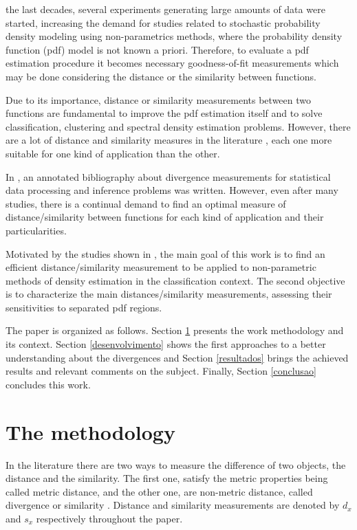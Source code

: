 \documentclass[conference]{IEEEtran}
\begin{document}
 the last decades, several experiments generating large amounts of data were started, increasing the demand for studies related to stochastic probability density modeling using non-parametrics methods, where the probability density function (pdf) model is not known a priori. Therefore, to evaluate a pdf estimation procedure it becomes necessary goodness-of-fit measurements which may be done considering the distance or the similarity between functions.

Due to its importance, distance or similarity measurements between two functions are fundamental to improve the pdf estimation itself and to solve classification, clustering and spectral density estimation problems. However, there are a lot of distance and similarity measures in the literature \cite{deza2006dictionary} \cite{deza2009encyclopedia}, each one more suitable for one kind of application than the other.

In \cite{basseville2013divergence}, an annotated bibliography about divergence measurements for statistical data processing and inference problems was written. However, even after many studies, there is a continual demand to find an optimal measure of distance/similarity between functions for each kind of application and their particularities.

Motivated by the studies shown in \cite{cha2007comprehensive}, the main goal of this work is to find an efficient distance/similarity measurement to be applied to non-parametric methods of density estimation in the classification context. The second objective is to characterize the main distances/similarity measurements, assessing their sensitivities to separated pdf regions.

The paper is organized as follows. Section \ref{metho} presents the work methodology and its context. Section \ref{desenvolvimento} shows the first approaches to a better understanding about the divergences and Section \ref{resultados} brings the achieved results and relevant comments on the subject. Finally, Section \ref{conclusao} concludes this work.

\section{The methodology}\label{metho}

In the literature there are two ways to measure the difference of two objects, the distance and the similarity. The first one, satisfy the metric properties being called metric distance, and the other one, are non-metric distance, called divergence or similarity \cite{cha2007comprehensive}. Distance and similarity measurements are denoted by $d_x$ and $s_x$ respectively throughout the paper.
\end{document}
